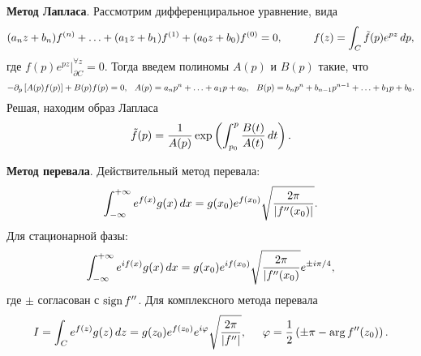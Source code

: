 \textbf{Метод Лапласа}. Рассмотрим дифференциральное уравнение, вида
\begin{equation*}
    (a_n z + b_n) f^{(n)} + \ldots + (a_1 z + b_1) f^{(1)} + (a_0 z + b_0) f^{(0)} = 0,
    \hspace{10 mm} 
    f(z) = \int_C \tilde{f} (p) e^{pz} \d p,
\end{equation*}
где $f(p) e^{pz} |_{\partial C}^{\forall  z} = 0$. Тогда введем полиномы $A(p)$ и $B(p)$ такие, что
\begin{equation*}
    - \partial_p \left[ A(p) f(p)\right] + B(p) f(p) = 0,
    \hspace{2.5 mm} 
    A(p) = a_n p^n +\ldots + a_1 p + a_0,
    \hspace{2.5 mm} 
    B(p) = b_n p^n + b_{n-1} p^{n-1} + \ldots + b_1 p + b_0.
\end{equation*}
Решая, находим образ Лапласа
\begin{equation*}
    \tilde{f}(p) = \frac{1}{A(p)} \exp\left(
        \int_{p_0}^{p} \frac{B(t)}{A(t)}\, d t
    \right).
\end{equation*}


\textbf{Метод перевала}. Действительный метод перевала:
\begin{equation*}
    \int_{-\infty}^{+\infty} e^{f(x)} g(x) \, d x = g(x_0) e^{f(x_0)} \sqrt{\frac{2\pi}{|f''(x_0)|}}.
\end{equation*}
Для стационарной фазы:
\begin{equation*}
    \int_{-\infty}^{+\infty} e^{i f(x)} g(x) \, d x = g(x_0) e^{i f (x_0)} 
    \sqrt{\frac{2\pi}{|f''(x_0)}} e^{\pm i \pi/4},
\end{equation*} 
где $\pm$ согласован с $\mathop{\mathrm{sign}}\nolimits f''$. 
Для комплексного метода перевала
\begin{equation*}
    I = \int_C e^{f(z)} g(z) \, d z = g(z_0) e^{f(z_0)} e^{i \varphi} \sqrt{\frac{2\pi}{|f''|}},
    \hspace{5 mm} 
    \varphi = \frac{1}{2}\left(\pm \pi - \arg f''(z_0) \right).
\end{equation*}



